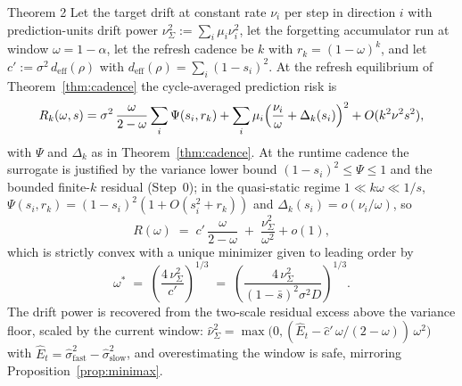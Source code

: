 \begin{restated}{Theorem 2}
Let the target drift at constant rate $\nu_i$ per step in direction $i$ with prediction-units drift power $\nu^2_\Sigma := \sum_i \mu_i \nu_i^2$, let the forgetting accumulator run at window $\omega = 1 - \alpha$, let the refresh cadence be $k$ with $r_k = (1-\omega)^k$, and let $c' := \sigma^2\, d_{\mathrm{eff}}(\rho)$ with $d_{\mathrm{eff}}(\rho) = \sum_i (1-s_i)^2$.
At the refresh equilibrium of Theorem~\ref{thm:cadence} the cycle-averaged prediction risk is
\[
  R_k(\omega,s) = \sigma^2\,\frac{\omega}{2-\omega}\sum_i \Psi(s_i,r_k)
  + \sum_i \mu_i\Bigl(\frac{\nu_i}{\omega}+\Delta_k(s_i)\Bigr)^2 + O(k^2\nu^2s^2),
\]
with $\Psi$ and $\Delta_k$ as in Theorem~\ref{thm:cadence}.
At the runtime cadence the surrogate is justified by the variance lower bound $(1-s_i)^2 \le \Psi \le 1$ and the bounded finite-$k$ residual (Step~0); in the quasi-static regime $1 \ll k\omega \ll 1/s$, $\Psi(s_i,r_k)=(1-s_i)^2(1+O(s_i^2+r_k))$ and $\Delta_k(s_i)=o(\nu_i/\omega)$, so
\begin{equation}
\label{eq:app-window-risk}
  R(\omega) \;=\; c'\,\frac{\omega}{2 - \omega} \;+\; \frac{\nu^2_\Sigma}{\omega^2} + o(1),
\end{equation}
which is strictly convex with a unique minimizer given to leading order by
\[
  \omega^* \;=\; \left(\frac{4\,\nu^2_\Sigma}{c'}\right)^{1/3}
  \;=\; \left(\frac{4\,\nu^2_\Sigma}{(1-\bar s)^2 \sigma^2 D}\right)^{1/3}.
\]
The drift power is recovered from the two-scale residual excess above the variance floor, scaled by the current window:
$\widehat\nu^2_\Sigma = \max\bigl(0, (\widehat E_t - \widehat c'\,\omega/(2-\omega))\,\omega^2\bigr)$ with $\widehat E_t = \widehat\sigma^2_{\mathrm{fast}} - \widehat\sigma^2_{\mathrm{slow}}$,
and overestimating the window is safe, mirroring Proposition~\ref{prop:minimax}.
\end{restated}

